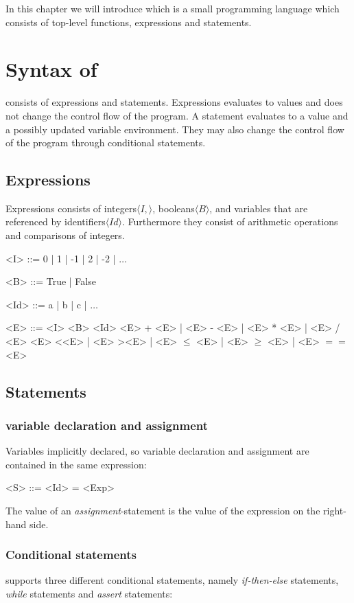 In this chapter we will introduce \explanguage which is a small programming language which consists of top-level functions, expressions and statements.

\section{Syntax of \explanguage}

\explanguage consists of expressions and statements. Expressions evaluates to values and does not change the control flow of the program. A statement evaluates to a value and a possibly updated variable environment. They may also change the control flow of the program through conditional statements. 

\subsection{Expressions}

Expressions consists of integers$\langle I, \rangle$, booleans$\langle B \rangle$,  and variables that are referenced by identifiers$\langle Id \rangle$. Furthermore they consist of arithmetic operations and comparisons of integers. 
\begin{grammar}
	<I> ::= 0 | 1 | -1 | 2 | -2 | $\ldots$
	
	<B> ::= True | False 
	
	<Id> ::= a | b | c | $\ldots$ 
	
	<E> ::= <I> 
	\alt <Id>
	 + <E> | <E> - <E> | <E> * <E> | <E> / <E>
	 \textless <E> | <E> \textgreater <E> | <E> $\leq$ <E> | <E> $\geq$ <E> | <E> $==$ <E>
\end{grammar}

\subsection{Statements}


\subsubsection{variable declaration and assignment}
Variables implicitly declared, so variable declaration and assignment are contained in the same expression:
\begin{grammar}
	<S> ::= <Id> = <Exp>
\end{grammar} 
The value of an \textsl{assignment}-statement is the value of the expression on the right-hand side.  
\subsubsection{Conditional statements}
\explanguage supports three different conditional statements, namely \textsl{if-then-else} statements, \textsl{while} statements and \textsl{assert} statements:

